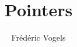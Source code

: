 \usepackage{ucll-code}

\usetikzlibrary{shadows,shapes.multipart}

\title{Pointers}
\author{Fr\'ed\'eric Vogels}




\begin{frame}
  \titlepage
\end{frame}











